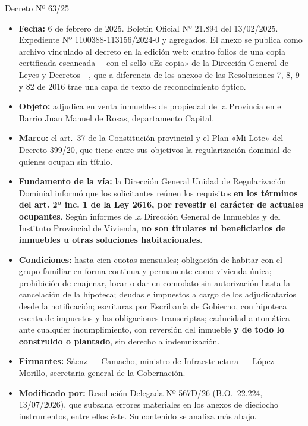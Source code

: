 \begin{ficha}{Decreto Nº 63/25}
\begin{itemize}[leftmargin=*,nosep]
\item \textbf{Fecha:} 6 de febrero de 2025. Boletín Oficial Nº 21.894 del 13/02/2025. Expediente Nº 1100388-113156/2024-0 y agregados. El anexo se publica como archivo vinculado al decreto en la edición web: cuatro folios de una copia certificada escaneada ---con el sello «Es copia» de la Dirección General de Leyes y Decretos---, que a diferencia de los anexos de las Resoluciones 7, 8, 9 y 82 de 2016 trae una capa de texto de reconocimiento óptico.
\item \textbf{Objeto:} adjudica en venta inmuebles de propiedad de la Provincia en el Barrio Juan Manuel de Rosas, departamento Capital.
\item \textbf{Marco:} el art.\ 37 de la Constitución provincial y el Plan «Mi Lote» del Decreto 399/20, que tiene entre sus objetivos la regularización dominial de quienes ocupan sin título.
\item \textbf{Fundamento de la vía:} la Dirección General Unidad de Regularización Dominial informó que los solicitantes reúnen los requisitos \textbf{en los términos del art. 2º inc. 1 de la Ley 2616, por revestir el carácter de actuales ocupantes}. Según informes de la Dirección General de Inmuebles y del Instituto Provincial de Vivienda, \textbf{no son titulares ni beneficiarios de inmuebles u otras soluciones habitacionales}.
\item \textbf{Condiciones:} hasta cien cuotas mensuales; obligación de habitar con el grupo familiar en forma continua y permanente como vivienda única; prohibición de enajenar, locar o dar en comodato sin autorización hasta la cancelación de la hipoteca; deudas e impuestos a cargo de los adjudicatarios desde la notificación; escrituras por Escribanía de Gobierno, con hipoteca exenta de impuestos y las obligaciones transcriptas; caducidad automática ante cualquier incumplimiento, con reversión del inmueble \textbf{y de todo lo construido o plantado}, sin derecho a indemnización.
\item \textbf{Firmantes:} Sáenz --- Camacho, ministro de Infraestructura --- López Morillo, secretaria general de la Gobernación.
\item \textbf{Modificado por:} Resolución Delegada Nº 567D/26 (B.O.\ 22.224, 13/07/2026), que subsana errores materiales en los anexos de dieciocho instrumentos, entre ellos éste. Su contenido se analiza más abajo.
\end{itemize}
\end{ficha}

